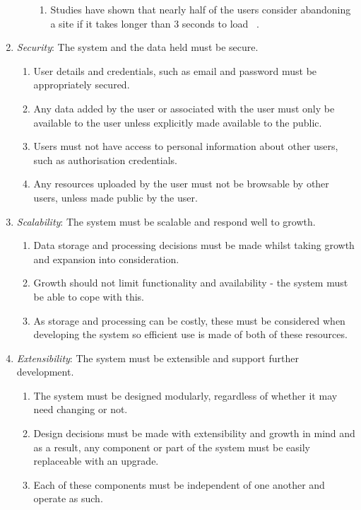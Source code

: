 \begin{enumerate}[label=\textbf{NF\arabic*}]
\begin{enumerate}
			\begin{enumerate}
				\item Studies have shown that nearly half of the users consider abandoning a site if it takes longer than 3 seconds to load ~\cite{Kissmetrics:Speed}.
			\end{enumerate}
		\end{enumerate}
	\item \textit{Security}: The system and the data held must be secure.
		\begin{enumerate}
			\item User details and credentials, such as email and password must be appropriately secured.
			\item Any data added by the user or associated with the user must only be available to the user unless explicitly made available to the public.
			\item Users must not have access to personal information about other users, such as authorisation credentials.
			\item Any resources uploaded by the user must not be browsable by other users, unless made public by the user.
		\end{enumerate}
	\item \textit{Scalability}: The system must be scalable and respond well to growth.
		\begin{enumerate}
			\item Data storage and processing decisions must be made whilst taking growth and expansion into consideration.
			\item Growth should not limit functionality and availability - the system must be able to cope with this.
			\item As storage and processing can be costly, these must be considered when developing the system so efficient use is made of both of these resources.
		\end{enumerate}
	\item \textit{Extensibility}: The system must be extensible and support further development.
		\begin{enumerate}
			\item The system must be designed modularly, regardless of whether it may need changing or not.
			\item Design decisions must be made with extensibility and growth in mind and as a result, any component or part of the system must be easily replaceable with an upgrade.
			\item Each of these components must be independent of one another and operate as such.

\end{enumerate}
\end{enumerate}
